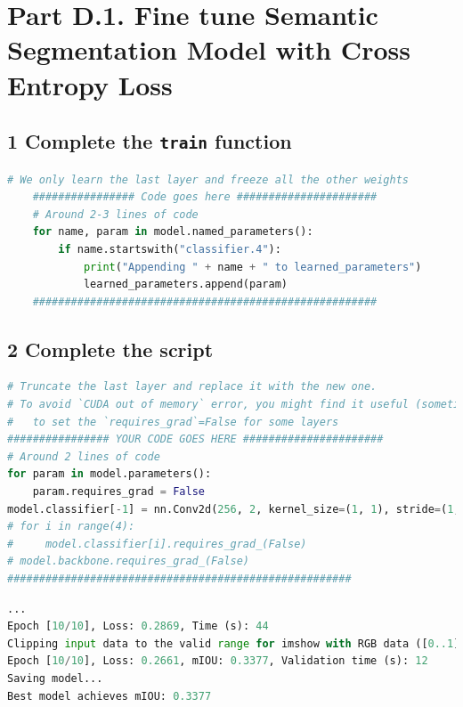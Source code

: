 \documentclass{article}
\begin{document}
\clearpage
\section*{Part D.1. Fine tune Semantic Segmentation Model with Cross Entropy Loss}



\subsection*{1 Complete the \texttt{train} function}

\begin{lstlisting}[language=Python]
    # We only learn the last layer and freeze all the other weights
    ################ Code goes here ######################
    # Around 2-3 lines of code
    for name, param in model.named_parameters():
        if name.startswith("classifier.4"):
            print("Appending " + name + " to learned_parameters")
            learned_parameters.append(param)
    ######################################################	
\end{lstlisting}



\subsection*{2 Complete the script}


\begin{lstlisting}[language=Python]
# Truncate the last layer and replace it with the new one.
# To avoid `CUDA out of memory` error, you might find it useful (sometimes required)
#   to set the `requires_grad`=False for some layers
################ YOUR CODE GOES HERE ######################
# Around 2 lines of code
for param in model.parameters():
    param.requires_grad = False
model.classifier[-1] = nn.Conv2d(256, 2, kernel_size=(1, 1), stride=(1, 1))
# for i in range(4):
#     model.classifier[i].requires_grad_(False)
# model.backbone.requires_grad_(False)
######################################################
\end{lstlisting}

\begin{lstlisting}[language=Python]
...
Epoch [10/10], Loss: 0.2869, Time (s): 44
Clipping input data to the valid range for imshow with RGB data ([0..1] for floats or [0..255] for integers).
Epoch [10/10], Loss: 0.2661, mIOU: 0.3377, Validation time (s): 12
Saving model...
Best model achieves mIOU: 0.3377


\end{lstlisting}
\end{document}
